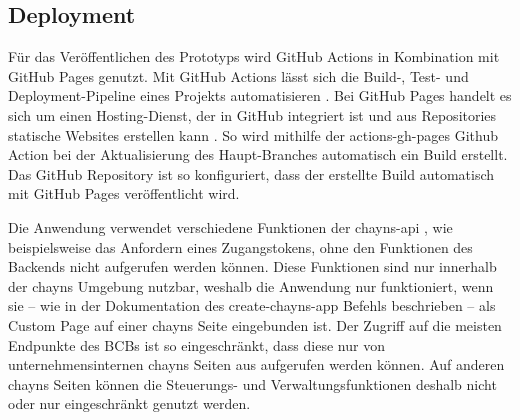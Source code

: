 \subsection{Deployment}
Für das Veröffentlichen des Prototyps wird GitHub Actions in Kombination mit GitHub Pages genutzt. Mit GitHub Actions lässt sich die Build-, Test- und Deployment-Pipeline eines Projekts automatisieren \cite{GitHubActions}. Bei GitHub Pages handelt es sich um einen Hosting-Dienst, der in GitHub integriert ist und aus Repositories statische Websites erstellen kann \cite{GitHubPages}. So wird mithilfe der actions-gh-pages Github Action \cite{ActionsGhPages} bei der Aktualisierung des Haupt-Branches automatisch ein Build erstellt. Das GitHub Repository ist so konfiguriert, dass der erstellte Build automatisch mit GitHub Pages veröffentlicht wird.

Die Anwendung verwendet verschiedene Funktionen der chayns-api \cite{ChaynsApi}, wie beispielsweise das Anfordern eines Zugangstokens, ohne den Funktionen des Backends nicht aufgerufen werden können. Diese Funktionen sind nur innerhalb der chayns Umgebung nutzbar, weshalb die Anwendung nur funktioniert, wenn sie – wie in der Dokumentation des create-chayns-app Befehls beschrieben \cite{CreateChaynsApp} – als Custom Page auf einer chayns Seite eingebunden ist. Der Zugriff auf die meisten Endpunkte des \ac{BCB}s ist so eingeschränkt, dass diese nur von unternehmensinternen chayns Seiten aus aufgerufen werden können. Auf anderen chayns Seiten können die Steuerungs- und Verwaltungsfunktionen deshalb nicht oder nur eingeschränkt genutzt werden.

